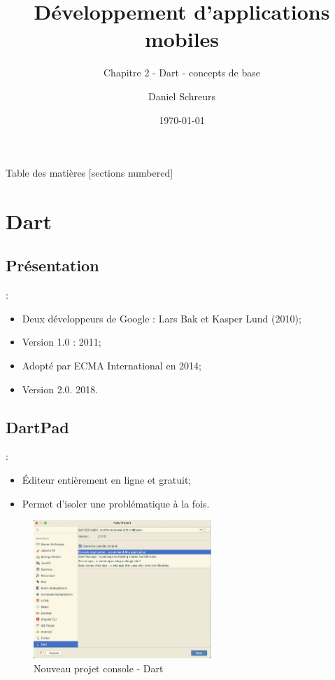 \documentclass[10pt]{beamer}
\title{Développement d'applications mobiles}
\subtitle{Chapitre 2 - Dart - concepts de base}
\date{\today}
\author{Daniel Schreurs}
\institute{Haute École de la Province de Liège}
\begin{document}
\maketitle

\begin{frame}[allowframebreaks]{Table des matières}
    [sections numbered]
    \tableofcontents
\end{frame}

\section{Dart}
\subsection{Présentation}
\begin{frame}[fragile,t]{\secname : \subsecname}
    \begin{itemize}
        \item Deux développeurs de Google : Lars Bak et Kasper Lund (2010);
        \item Version 1.0 : 2011;
        \item Adopté par ECMA International en 2014;
        \item Version 2.0. 2018.
    \end{itemize}
\end{frame}

\subsection{DartPad}
\begin{frame}[fragile,t]{\secname : \subsecname}
    \begin{itemize}
        \item Éditeur entièrement en ligne et gratuit;
        \item Permet d'isoler une problématique à la fois.
    \end{itemize}
    \begin{figure}
        \begin{center}
            \includegraphics[width=0.60\textwidth]{../assets/img/new-project-1--dart.jpg}
            \caption*{Nouveau projet console - Dart}
        \end{center}
    \end{figure}
\end{frame}
\end{document}
